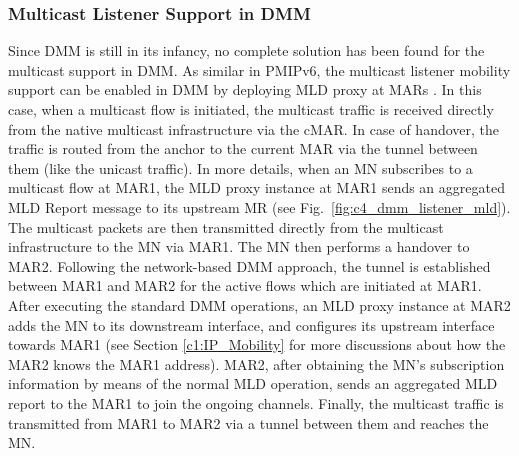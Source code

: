 \subsubsection{Multicast Listener Support in DMM}
Since DMM is still in its infancy, no complete solution has been found for the multicast support in DMM. As similar in PMIPv6, the multicast listener mobility support can be enabled in DMM by deploying MLD proxy at MARs \cite{multicast_DMM_sergio, Thinh_ICNS,Thinh_VTC}. In this case, when a multicast flow is initiated, the multicast traffic is received directly from the native multicast infrastructure via the cMAR. In case of handover, the traffic is routed from the anchor to the current MAR via the tunnel between them (like the unicast traffic). In more details, when an MN subscribes to a multicast flow at MAR1, the MLD proxy instance at MAR1 sends an aggregated MLD Report message to its upstream MR (see  Fig.~\ref{fig:c4_dmm_listener_mld}). The multicast packets are then transmitted directly from the multicast infrastructure to the MN via MAR1. The MN then performs a handover to MAR2. Following the network-based DMM approach, the tunnel is established between MAR1 and MAR2 for the active flows which are initiated at MAR1. After executing the standard DMM operations, an MLD proxy instance at MAR2 adds the MN to its downstream interface, and configures its upstream interface towards MAR1 (see Section \ref{c1:IP_Mobility} for more discussions about how the MAR2 knows the MAR1 address). MAR2, after obtaining the MN's subscription information by means of the normal MLD operation, sends an aggregated MLD report to the MAR1 to join the ongoing channels. Finally, the multicast traffic is transmitted from MAR1 to MAR2 via a tunnel between them and reaches the MN. 


